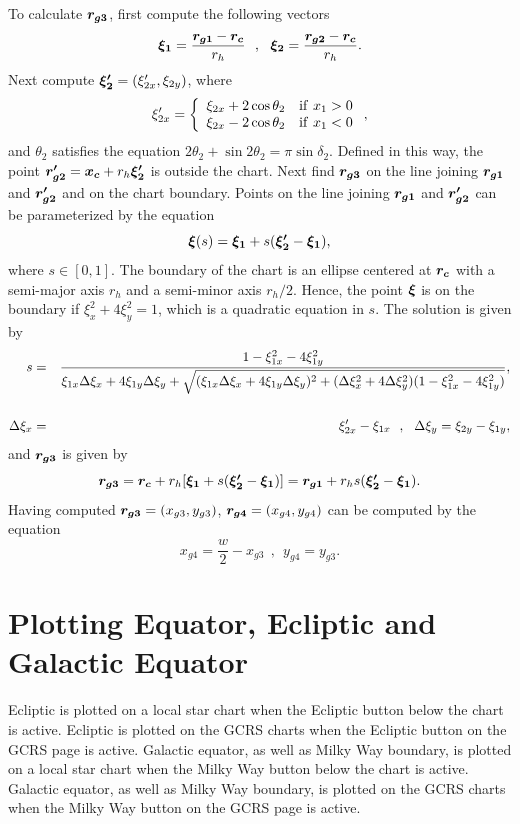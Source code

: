 \documentclass[12pt]{article}
\newcommand \beq {\begin{equation}}
\newcommand \eeq {\end{equation}}
\newcommand \beqn {\begin{eqnarray}}
\newcommand \eeqn {\end{eqnarray}}
\newcommand{\ve}[1]{\mbox{\boldmath $#1$}}
\begin{document}
To calculate $\ve{r_{g3}}$, first compute the following vectors 
\beq
  \ve{\xi_1} = \frac{\ve{r_{g1}}-\ve{r_c}}{r_h} \ \ , \ \ 
  \ve{\xi_2} = \frac{\ve{r_{g2}}-\ve{r_c}}{r_h} .
\eeq
Next compute $\ve{\xi'_2} = (\xi'_{2x} , \xi_{2y})$, where 
\beq
  \xi'_{2x} = \left \{ \begin{array}{ll} \xi_{2x} + 2\cos \theta_2 & {\rm if }~x_1>0 \\ 
\xi_{2x} -2\cos \theta_2 & {\rm if }~x_1 < 0 \end{array} \right. ,
\eeq
and $\theta_2$ satisfies the equation $2\theta_2 + \sin 2\theta_2 = \pi \sin \delta_2$. 
Defined in this way, the point $\ve{r'_{g2}}=\ve{x_c}+r_h \ve{\xi'_2}$ is outside the 
chart. Next find $\ve{r_{g3}}$ on the line joining $\ve{r_{g1}}$ and 
$\ve{r'_{g2}}$ and on the chart boundary. Points on the line joining 
$\ve{r_{g1}}$ and $\ve{r'_{g2}}$ can be parameterized by the equation 
\beq
  \ve{\xi}(s) = \ve{\xi_1} + s(\ve{\xi'_2} - \ve{\xi_1}) , 
\eeq
where $s \in [0,1]$. The boundary of the chart is an ellipse centered at $\ve{r_c}$ 
with a semi-major axis $r_h$ and a semi-minor axis $r_h/2$. Hence, 
the point $\ve{\xi}$ is on the boundary if $\xi_x^2 + 4\xi_y^2=1$, which is a quadratic 
equation in $s$. The solution is given by 
\beqn
  s &=& \frac{1-\xi_{1x}^2 - 4\xi_{1y}^2}{\xi_{1x}\Delta \xi_x + 4\xi_{1y} \Delta \xi_y 
+ \sqrt{(\xi_{1x}\Delta \xi_x + 4\xi_{1y}\Delta \xi_y)^2 + 
(\Delta \xi_x^2 + 4\Delta \xi_y^2)(1-\xi_{1x}^2 - 4\xi_{1y}^2)}} , \cr \cr 
 \Delta \xi_x &=& \xi'_{2x}-\xi_{1x} \ \ , \ \ 
 \Delta \xi_y = \xi_{2y} - \xi_{1y} ,
\eeqn
and $\ve{r_{g3}}$ is given by 
\beq
  \ve{r_{g3}} = \ve{r_c} + r_h[\ve{\xi_1} + s(\ve{\xi'_2}-\ve{\xi_1})] 
 = \ve{r_{g1}} + r_h s (\ve{\xi'_2}-\ve{\xi_1}) .
\eeq
Having computed $\ve{r_{g3}}=(x_{g3},y_{g3})$, $\ve{r_{g4}}=(x_{g4},y_{g4})$ 
can be computed by the equation 
\beq
  x_{g4} = \frac{w}{2}-x_{g3} \ \ , \ \ y_{g4} = y_{g3} .
\eeq

\section{Plotting Equator, Ecliptic and Galactic Equator} 

Ecliptic is plotted on a local star chart when the Ecliptic button below 
the chart is active. Ecliptic is plotted on the GCRS charts when the 
Ecliptic button on the GCRS page is active. Galactic equator, as well as 
Milky Way boundary, is plotted 
on a local star chart when the Milky Way button below the chart is active. 
Galactic equator, as well as Milky Way boundary, is plotted on the GCRS 
charts when the Milky Way button on the GCRS page is active. 
\end{document}
